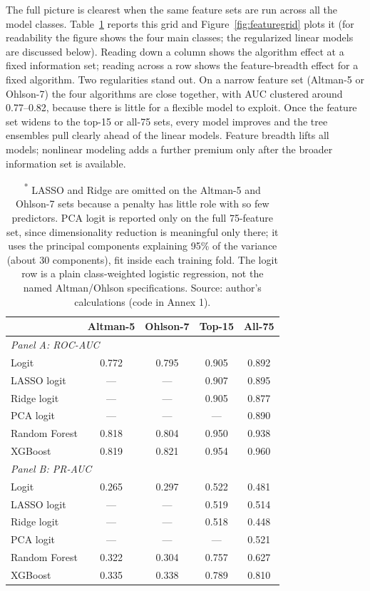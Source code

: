 \documentclass[12pt,a4paper]{article}
\begin{document}
The full picture is clearest when the same feature sets are run across all the
model classes. Table~\ref{tab:feature-grid} reports this
grid and Figure~\ref{fig:featuregrid} plots it (for readability the figure
shows the four main classes; the regularized linear models are discussed
below). Reading down a column shows the
algorithm effect at a fixed information set; reading across a row shows the
feature-breadth effect for a fixed algorithm. Two regularities stand out. On a
narrow feature set (Altman-5 or Ohlson-7) the four algorithms are close
together, with AUC clustered around 0.77--0.82, because there is little for a
flexible model to exploit. Once the feature set widens to the top-15 or all-75
sets, every model improves and the tree ensembles pull clearly ahead of the
linear models. Feature breadth lifts all models; nonlinear modeling adds a
further premium only after the broader information set is available.

\begin{table}[H]
\centering
\caption{Performance by model class and feature set at H1.\textsuperscript{*}}
\label{tab:feature-grid}
\small
\begin{tabular}{lcccc}
\toprule
 & Altman-5 & Ohlson-7 & Top-15 & All-75 \\
\midrule
\multicolumn{5}{l}{\textit{Panel A: ROC-AUC}} \\
\midrule
Logit          & 0.772 & 0.795 & 0.905 & 0.892 \\
LASSO logit    & ---   & ---   & 0.907 & 0.895 \\
Ridge logit    & ---   & ---   & 0.905 & 0.877 \\
PCA logit      & ---   & ---   & ---   & 0.890 \\
Random Forest  & 0.818 & 0.804 & 0.950 & 0.938 \\
XGBoost        & 0.819 & 0.821 & 0.954 & 0.960 \\
\midrule
\multicolumn{5}{l}{\textit{Panel B: PR-AUC}} \\
\midrule
Logit          & 0.265 & 0.297 & 0.522 & 0.481 \\
LASSO logit    & ---   & ---   & 0.519 & 0.514 \\
Ridge logit    & ---   & ---   & 0.518 & 0.448 \\
PCA logit      & ---   & ---   & ---   & 0.521 \\
Random Forest  & 0.322 & 0.304 & 0.757 & 0.627 \\
XGBoost        & 0.335 & 0.338 & 0.789 & 0.810 \\
\bottomrule
\end{tabular}
\caption*{\footnotesize \textsuperscript{*} LASSO and Ridge are omitted on the Altman-5 and
Ohlson-7 sets because a penalty has little role with so few predictors. PCA
logit is reported only on the full 75-feature set, since dimensionality
reduction is meaningful only there; it uses the principal components explaining
95\% of the variance (about 30 components), fit inside each training fold. The
logit row is a plain class-weighted logistic regression, not the named
Altman/Ohlson specifications. Source: author's calculations (code in Annex 1).}
\end{table}
\end{document}
